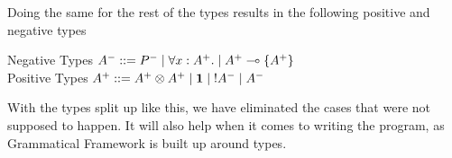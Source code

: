 Doing the same for the rest of the types results in the following positive and negative types
\begin{texto}
Negative Types $A^- ::= P^- \; | \; \forall x:A^+. \; | \; A^+ \multimap \{ A^+ \}$\\
Positive Types \hspace{0.8pt} $A^+ ::= A^+ \otimes A^+ \; | \; \mathord{\text{\rm\bf 1}} \; | \; \mathord{\text{\rm !}} A^- \; | \; A^-$
\end{texto}
With the types split up like this, we have eliminated the cases that were not supposed to happen. It will also help when it comes to writing the program, as Grammatical Framework is built up around types.
\\ 
\\ 

\pagebreak
